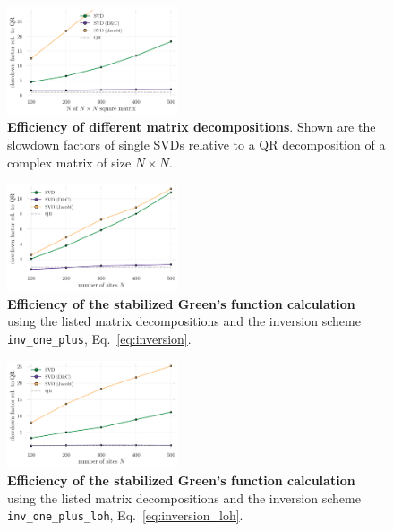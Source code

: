 \documentclass[%
 reprint,
superscriptaddress,
citeautoscript,
showpacs,
 amsmath,amssymb,
 aps,
 prb,
longbibliography,
]{revtex4-2}
\begin{document}
\begin{figure}
	\includegraphics[width=0.45\textwidth]{figures/benchmark_decomps.pdf}
	\caption{\textbf{Efficiency of different matrix decompositions}. Shown are the slowdown factors of single SVDs relative to a QR decomposition of a complex matrix of size $N \times N$. \label{fig:benchmark_decomps}}
\end{figure}



\begin{figure}
	\includegraphics[width=0.45\textwidth]{figures/benchmark_fact_inv_one_plus.pdf}
	\caption{\textbf{Efficiency of the stabilized Green's function calculation} using the listed matrix decompositions and the inversion scheme \texttt{inv\_one\_plus}, Eq.~\eqref{eq:inversion}. \label{fig:greens_benchmark_regularinv}}
\end{figure}

\begin{figure}
	\includegraphics[width=0.45\textwidth]{figures/benchmark_fact_inv_one_plus_loh.pdf}
	\caption{\textbf{Efficiency of the stabilized Green's function calculation} using the listed matrix decompositions and the inversion scheme \texttt{inv\_one\_plus\_loh}, Eq.~\eqref{eq:inversion_loh}. \label{fig:greens_benchmark_loh}}
\end{figure}
\end{document}
